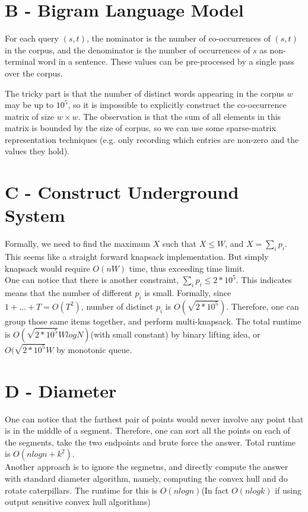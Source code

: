 \documentclass{article}
\begin{document}
\section*{B - Bigram Language Model}

For each query $(s,t)$, the nominator is the number of co-occurrences of $(s,t)$ in the corpus, and the denominator is the number of occurrences of $s$ as non-terminal word in a sentence. These values can be pre-processed by a single pass over the corpus.

The tricky part is that the number of distinct words appearing in the corpus $w$ may be up to $10^5$, so it is impossible to explicitly construct the co-occurrence matrix of size $w \times w$. The observation is that the sum of all elements in this matrix is bounded by the size of corpus, so we can use some sparse-matrix representation techniques (e.g. only recording which entries are non-zero and the values they hold).

\section*{C - Construct Underground System}
Formally, we need to find the maximum $X$ such that $X \leq W$, and $X = \sum_i p_i$. This seems like a straight forward knapsack implementation. But simply knapsack would require $O(nW)$ time, thus exceeding time limit. \\
One can notice that there is another constraint, $\sum_i p_i \leq 2 * 10^5$. This indicates means that the number of different $p_i$ is small. Formally, since $1 + ... + T = O(T^2)$, number of distinct $p_i$ is $O(\sqrt{2 * 10^5})$. Therefore, one can group those same items together, and perform multi-knapsack. The total runtime is $O(\sqrt{2 * 10^5} W logN)$(with small constant) by binary lifting idea, or $O(\sqrt{2 * 10^5} W$ by monotonic queue.


\section*{D - Diameter}
One can notice that the farthest pair of points would never involve any point that is in the middle of a segment. Therefore, one can sort all the points on each of the segments, take the two endpoints and brute force the answer. Total runtime is $O(n logn + k^2)$. \\
Another approach is to ignore the segmetns, and directly compute the answer with standard diameter algorithm, namely, computing the convex hull and do rotate caterpillars. The runtime for this is $O(n logn)$(In fact $O(nlog k)$ if using output sensitive convex hull algorithms) \\
\end{document}
